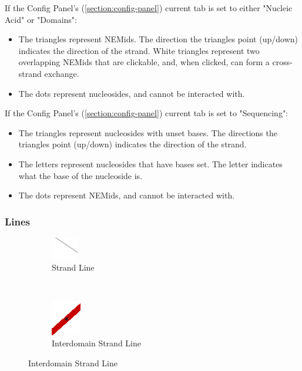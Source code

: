 \documentclass[titlepage]{article}
\begin{document}
	If the Config Panel's (\ref{section:config-panel}) current tab is set to either "Nucleic Acid" or "Domains":
	\begin{itemize}
		\item The triangles represent NEMids. The direction the triangles point (up/down) indicates the direction of the strand. White triangles represent two overlapping NEMids that are clickable, and, when clicked, can form a cross-strand exchange.
		\item The dots represent nucleosides, and cannot be interacted with.
	\end{itemize}

	If the Config Panel's (\ref{section:config-panel}) current tab is set to "Sequencing":
	\begin{itemize}
		\item The triangles represent nucleosides with unset bases. The directions the triangles point (up/down) indicates the direction of the strand.
		\item The letters represent nucleosides that have bases set. The letter indicates what the base of the nucleoside is. 
		\item The dots represent NEMids, and cannot be interacted with.
	\end{itemize}

	\subsubsection{Lines}

	\begin{figure}[h]
		\centering
		\caption{Side View Plot Line Graphics}
		\label{fig:side-view-plot-line-graphics}
		
		\begin{subfigure}{.4\linewidth}
			\centering
			\includegraphics[width=.3in]{strand-line.png}
			\caption{Strand Line}
			\label{fig:strand-line}
		\end{subfigure}%
		~
		\begin{subfigure}{.3\linewidth}
			\centering
			\includegraphics[width=.3in]{interdomain-strand-line.png}
			\caption{Interdomain Strand Line}
			\label{fig:interdomain-strand-line}
		\end{subfigure}
	\end{figure}
\end{document}
